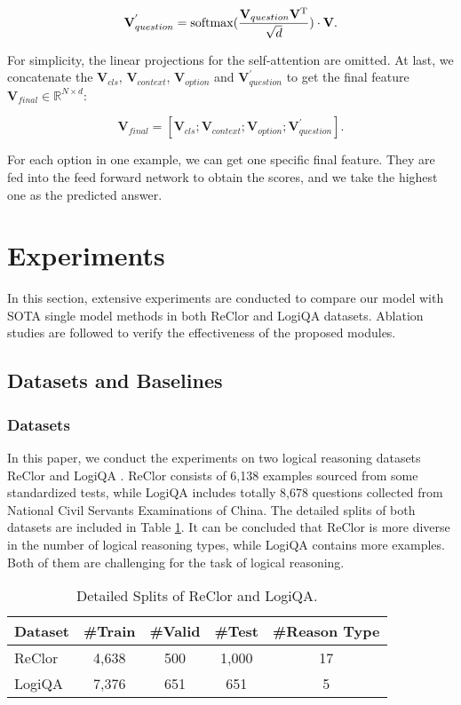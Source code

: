\documentclass[sigconf]{acmart}
\begin{document}
\begin{equation}
	\mathbf{V}_{question}^{'} = {\rm softmax}(\frac{{{\mathbf{V}_{question}}{\mathbf{V}^{\rm T}}}}{{\sqrt d }})\cdot \mathbf{V}.
\end{equation}

For simplicity, the linear projections for the self-attention are omitted. At last, we concatenate the $\mathbf{V}_{cls}$, $\mathbf{V}_{context}$, $\mathbf{V}_{option}$ and $\mathbf{V}_{question}^{'}$ to get the final feature $\mathbf{V}_{final} \in \mathbb{R}^{N\times d}$:

\begin{equation}
	\mathbf{V}_{final} = [\mathbf{V}_{cls};\mathbf{V}_{context};\mathbf{V}_{option};\mathbf{V}_{question}^{'}].
\end{equation}

For each option in one example, we can get one specific final feature. They are fed into the feed forward network to obtain the scores, and we take the highest one as the predicted answer. 

\section{Experiments}
In this section, extensive experiments are conducted to compare our model with SOTA single model methods in both ReClor and LogiQA datasets. Ablation studies are followed to verify the effectiveness of the proposed modules.


\subsection{Datasets and Baselines}
\subsubsection{\textbf{Datasets}}
In this paper, we conduct the experiments on two logical reasoning datasets ReClor \cite{yu2019reclor} and LogiQA \cite{liu2020logiqa}. ReClor consists of 6,138 examples sourced from some standardized tests, while LogiQA includes totally 8,678 questions collected from National Civil Servants Examinations of China. The detailed splits of both datasets are included in Table \ref{dataset}. It can be concluded that ReClor is more diverse in the number of logical reasoning types, while LogiQA contains more examples. Both of them are challenging for the task of logical reasoning.

\begin{table}[t]
	\centering
	\caption{Detailed Splits of ReClor and LogiQA.}
	\vspace{-0.3cm}
	\begin{tabular}{p{1.7cm}|cccc}
		\toprule
		\textbf{Dataset} &\textbf{\#Train} &\textbf{\#Valid} &\textbf{\#Test} &\textbf{\#Reason Type}\\
		\hline
		ReClor & 4,638 &500 &1,000 &17\\
		LogiQA & 7,376 &651 &651 &5\\
		\bottomrule
	\end{tabular}
	\label{dataset}
	\vspace{-0.2cm}
\end{table}
\end{document}

